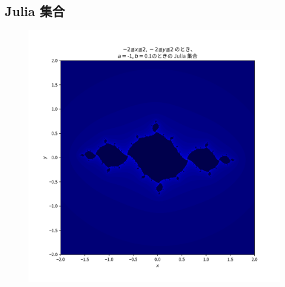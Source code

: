 \subsection{Julia 集合}
\begin{figure}[htbp]
  \centering
  \includegraphics[keepaspectratio, scale=0.8]{images/OtherProblem/ctest5_2.png}
\end{figure}

